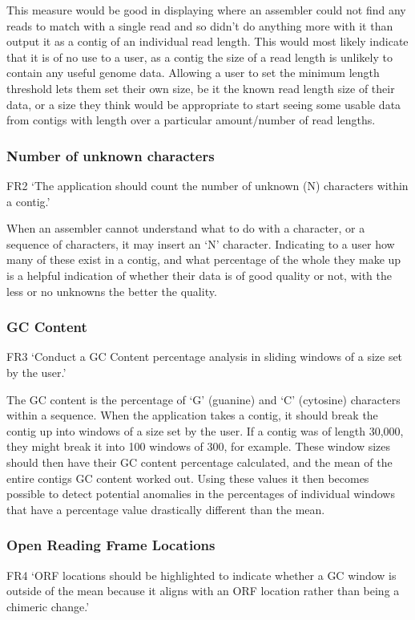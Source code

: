 This measure would be good in displaying where an assembler could not find any reads to match with a single read and so didn't do anything more with it than output it as a contig of an individual read length. This would most likely indicate that it is of no use to a user, as a contig the size of a read length is unlikely to contain any useful genome data. Allowing a user to set the minimum length threshold lets them set their own size, be it the known read length size of their data, or a size they think would be appropriate to start seeing some usable data from contigs with length over a particular amount/number of read lengths.

\subsubsection{Number of unknown characters}
FR2 `The application should count the number of unknown (N) characters within a contig.'

When an assembler cannot understand what to do with a character, or a sequence of characters, it may insert an `N' character. Indicating to a user how many of these exist in a contig, and what percentage of the whole they make up is a helpful indication of whether their data is of good quality or not, with the less or no unknowns the better the quality.

\subsubsection{GC Content}
FR3 `Conduct a GC Content percentage analysis in sliding windows of a size set by the user.'

The GC content is the percentage of `G' (guanine) and `C' (cytosine) characters within a sequence\cite{citeulike:14021291}. When the application takes a contig, it should break the contig up into windows of a size set by the user. If a contig was of length 30,000, they might break it into 100 windows of 300, for example. These window sizes should then have their GC content percentage calculated, and the mean of the entire contigs GC content worked out. Using these values it then becomes possible to detect potential anomalies in the percentages of individual windows that have a percentage value drastically different than the mean.

\subsubsection{Open Reading Frame Locations}
FR4 `ORF locations should be highlighted to indicate whether a GC window is outside of the mean because it aligns with an ORF location rather than being a chimeric change.'

